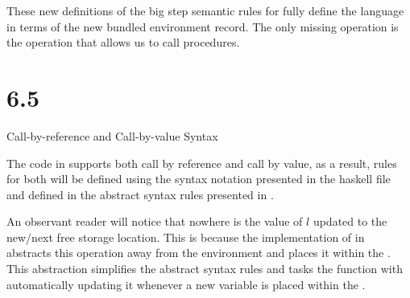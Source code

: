 
\noindent\makebox[\linewidth]{\rule{\textwidth}{0.4pt}}

These new definitions of the big step semantic rules for  fully define the language in terms of the new bundled environment record. The only missing operation is the  operation that allows us to call procedures.

\section{6.5}{Call-by-reference and Call-by-value Syntax}

The code in  supports both call by reference and call by value, as a result, rules for both will be defined using the syntax notation presented in the haskell file and defined in the abstract syntax rules presented in .

\noindent\makebox[\linewidth]{\rule{\textwidth}{0.4pt}}



\noindent\makebox[\linewidth]{\rule{\textwidth}{0.4pt}}

An observant reader will notice that nowhere is the value of $l$ updated to the new/next free storage location. This is because the implementation of  in  abstracts this operation away from the environment and places it within the . This abstraction simplifies the abstract syntax rules and tasks the  function with automatically updating it whenever a new variable is placed within the .


